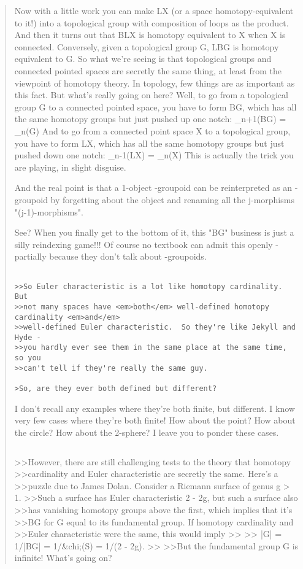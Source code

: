 \begin{quote}
Now with a little work you can make LX (or a space homotopy-equivalent
to it!) into a topological group with composition of loops as the product.
And then it turns out that BLX is homotopy equivalent to X when X is
connected.  Conversely, given a topological group G, LBG is homotopy 
equivalent to G.  
So what we're seeing is that topological groups and connected pointed 
spaces are secretly the same thing, at least from the viewpoint of 
homotopy theory.  In topology, few things are as important as this fact.
But what's really going on here?   Well, to go from a topological group G 
to a connected pointed space, you have to form BG, which has all the same 
homotopy groups but just pushed up one notch:
\pi _{n+1}(BG) = \pi _{n}(G)               
And to go from a connected point space X to a topological group, you have 
to form LX, which has all the same homotopy groups but just pushed down one
notch:
\pi _{n-1}(LX) = \pi _{n}(X)              
This is actually the trick you are playing, in slight disguise.

And the real point is that a 1-object \omega -groupoid can be 
reinterpreted as an \omega -groupoid by forgetting about the 
object and renaming all the j-morphisms "(j-1)-morphisms".  

See?  When you finally get to the bottom of it, this "BG" business
is just a silly reindexing game!!!   Of course no textbook can admit 
this openly - partially because they don't talk about \omega -groupoids.


\begin{verbatim}

>>So Euler characteristic is a lot like homotopy cardinality.  But
>>not many spaces have <em>both</em> well-defined homotopy cardinality <em>and</em> 
>>well-defined Euler characteristic.  So they're like Jekyll and Hyde - 
>>you hardly ever see them in the same place at the same time, so you 
>>can't tell if they're really the same guy.

>So, are they ever both defined but different?
\end{verbatim}
    

I don't recall any examples where they're both finite, but different.  
I know very few cases where they're both finite!   How about the point?
How about the circle?  How about the 2-sphere?  I leave you to ponder 
these cases.


$$

>>However, there are still challenging tests to the theory that homotopy
>>cardinality and Euler characteristic are secretly the same.  Here's a
>>puzzle due to James Dolan.  Consider a Riemann surface of genus g > 1.
>>Such a surface has Euler characteristic 2 - 2g, but such a surface also
>>has vanishing homotopy groups above the first, which implies that it's
>>BG for G equal to its fundamental group.  If homotopy cardinality and
>>Euler characteristic were the same, this would imply
>>
>>                 |G| = 1/|BG| = 1/&chi;(S) = 1/(2 - 2g).
>>
>>But the fundamental group G is infinite!  What's going on?  


\end{quote}
